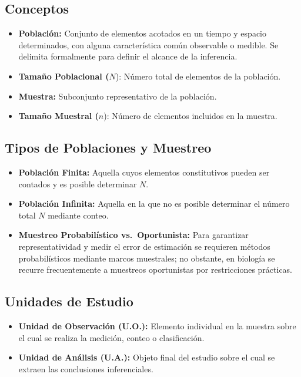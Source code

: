 \documentclass[
  spanish,
  letterpaper,
  DIV=11,
  numbers=noendperiod]{scrreprt}
\providecommand{\tightlist}{%
  \setlength{\itemsep}{0pt}\setlength{\parskip}{0pt}}
\begin{document}
\subsection{Conceptos}\label{conceptos}

\begin{itemize}
\tightlist
\item
  \textbf{Población:} Conjunto de elementos acotados en un tiempo y
  espacio determinados, con alguna característica común observable o
  medible. Se delimita formalmente para definir el alcance de la
  inferencia.
\item
  \textbf{Tamaño Poblacional (}\(N\)): Número total de elementos de la
  población.
\item
  \textbf{Muestra:} Subconjunto representativo de la población.
\item
  \textbf{Tamaño Muestral (}\(n\)): Número de elementos incluidos en la
  muestra.
\end{itemize}

\subsection{Tipos de Poblaciones y
Muestreo}\label{tipos-de-poblaciones-y-muestreo}

\begin{itemize}
\tightlist
\item
  \textbf{Población Finita:} Aquella cuyos elementos constitutivos
  pueden ser contados y es posible determinar \(N\).
\item
  \textbf{Población Infinita:} Aquella en la que no es posible
  determinar el número total \(N\) mediante conteo.
\item
  \textbf{Muestreo Probabilístico vs.~Oportunista:} Para garantizar
  representatividad y medir el error de estimación se requieren métodos
  probabilísticos mediante marcos muestrales; no obstante, en biología
  se recurre frecuentemente a muestreos oportunistas por restricciones
  prácticas.
\end{itemize}

\subsection{Unidades de Estudio}\label{unidades-de-estudio}

\begin{itemize}
\tightlist
\item
  \textbf{Unidad de Observación (U.O.):} Elemento individual en la
  muestra sobre el cual se realiza la medición, conteo o clasificación.
\item
  \textbf{Unidad de Análisis (U.A.):} Objeto final del estudio sobre el
  cual se extraen las conclusiones inferenciales.
\end{itemize}
\end{document}
